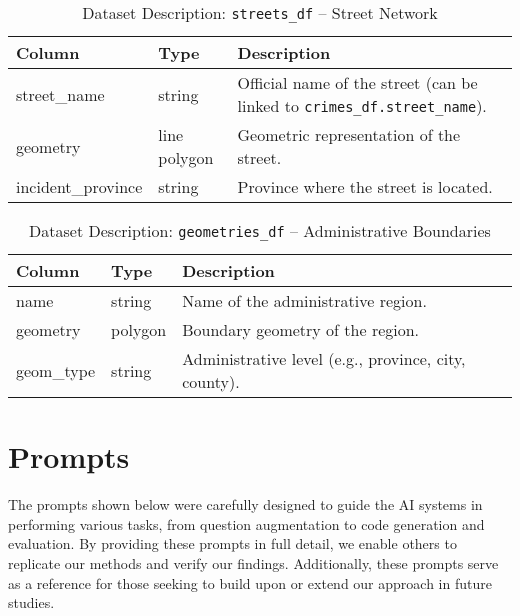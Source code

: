\begin{table}[H]
\centering
\scriptsize
\begin{tabular}{|l|l|p{8cm}|}
  \hline
  \textbf{Column} & \textbf{Type} & \textbf{Description} \\
\hline
street\_name & string & Official name of the street (can be linked to \texttt{crimes\_df.street\_name}). \\
geometry & line polygon & Geometric representation of the street. \\
incident\_province & string & Province where the street is located. \\
\hline
\end{tabular}
\caption{Dataset Description: \texttt{streets\_df} – Street Network}
\end{table}


\begin{table}[H]
\centering
\scriptsize
\begin{tabular}{|l|l|p{8cm}|}
  \hline
  \textbf{Column} & \textbf{Type} & \textbf{Description} \\
  \hline
name & string & Name of the administrative region. \\
geometry & polygon & Boundary geometry of the region. \\
geom\_type & string & Administrative level (e.g., province, city, county). \\
\hline
\end{tabular}
\caption{Dataset Description: \texttt{geometries\_df} – Administrative Boundaries}
\end{table}



\clearpage
\section{Prompts}
\label{appendix:prompts}

The prompts shown below were carefully designed to guide the AI systems in performing various tasks, from question augmentation to code generation and evaluation. By providing these prompts in full detail, we enable others to replicate our methods and verify our findings. Additionally, these prompts serve as a reference for those seeking to build upon or extend our approach in future studies.

